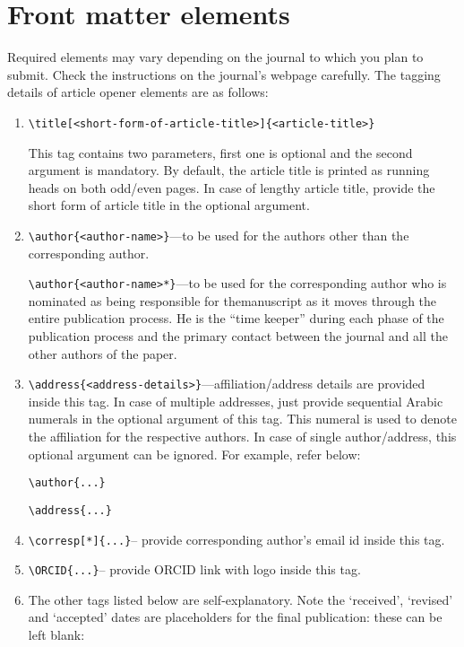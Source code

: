 \documentclass{article}
\begin{document}
\section{Front matter elements }
Required elements may vary depending on the journal to which you plan to submit. Check the instructions on the journal's webpage carefully. The tagging details of article opener elements are as follows:
\begin{enumerate}
\item \verb+\title[<short-form-of-article-title>]{<article-title>} +

This tag contains two parameters, first one is optional and the second argument is mandatory. By default, the article title is printed as running heads on both odd/even pages. In case of lengthy article title, provide the short form of article title in the optional argument.

\item \verb+\author{<author-name>}+---to be used for the authors other than the corresponding author.

\verb+\author{<author-name>*}+---to be used for the corresponding author who is nominated as being responsible for the\break manuscript as it moves through the entire publication process. He is the ``time keeper'' during each phase of the publication process and the primary contact between the journal and all the other authors of the paper.

\item \verb+\address{<address-details>}+---affiliation/address details are provided inside this tag. In case of multiple addresses, just provide sequential Arabic numerals in the optional argument of this tag. This numeral is used to denote the affiliation for the respective authors. In case of single author/address, this optional argument can be ignored. For example, refer below:

\verb+\author{...}+

\verb+\address{...}+

\item \verb+\corresp[*]{...}+-- provide corresponding author's email id inside this tag.

\item \verb+\ORCID{...}+-- provide ORCID link with logo inside this tag.

\item The other tags listed below are self-explanatory. Note the `received', `revised' and `accepted' dates are placeholders for the final publication: these can be left blank:


\end{enumerate}
\end{document}
